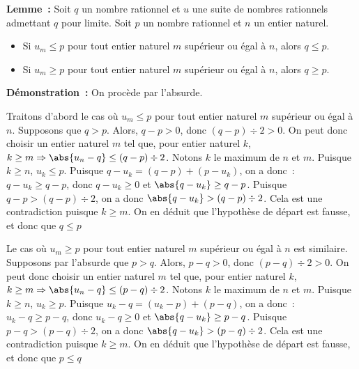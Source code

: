 \medskip

\noindent\textbf{Lemme :} Soit $q$ un nombre rationnel et $u$ une suite de nombres rationnels admettant $q$ pour limite.
    Soit $p$ un nombre rationnel et $n$ un entier naturel.
    \begin{itemize}[nosep]
        \item Si $u_m \leq p$ pour tout entier naturel $m$ supérieur ou égal à $n$, alors $q \leq p$.
        \item Si $u_m \geq p$ pour tout entier naturel $m$ supérieur ou égal à $n$, alors $q \geq p$.
    \end{itemize}

\medskip

\noindent\textbf{Démonstration :} On procède par l'absurde.
    
    Traitons d'abord le cas où $u_m \leq p$ pour tout entier naturel $m$ supérieur ou égal à $n$.
    Supposons que $q > p$. 
    Alors, $q - p > 0$, donc $(q - p) \div 2 > 0$. 
    On peut donc choisir un entier naturel $m$ tel que, pour entier naturel $k$, $k \geq m \Rightarrow \abs{u_n - q} \leq (q - p) \div 2$.
    Notons $k$ le maximum de $n$ et $m$. 
    Puisque $k \geq n$, $u_k \leq p$. 
    Puisque $q - u_k = (q - p) + (p - u_k)$, on a donc : $q - u_k \geq q - p$, donc $q - u_k \geq 0$ et $\abs{q - u_k} \geq q - p$.
    Puisque $q - p > (q - p) \div 2$, on a donc $\abs{q - u_k} > (q - p) \div 2$.
    Cela est une contradiction puisque $k \geq m$.
    On en déduit que l'hypothèse de départ est fausse, et donc que $q \leq p$

    Le cas où $u_m \geq p$ pour tout entier naturel $m$ supérieur ou égal à $n$ est similaire. 
    Supposons par l'absurde que $p > q$. 
    Alors, $p - q > 0$, donc $(p - q) \div 2 > 0$. 
    On peut donc choisir un entier naturel $m$ tel que, pour entier naturel $k$, $k \geq m \Rightarrow \abs{u_n - q} \leq (p - q) \div 2$.
    Notons $k$ le maximum de $n$ et $m$. 
    Puisque $k \geq n$, $u_k \geq p$. 
    Puisque $u_k - q = (u_k - p) + (p - q)$, on a donc : $u_k - q \geq p - q$, donc $u_k - q \geq 0$ et $\abs{q - u_k} \geq p - q$.
    Puisque $p - q > (p - q) \div 2$, on a donc $\abs{q - u_k} > (p - q) \div 2$.
    Cela est une contradiction puisque $k \geq m$.
    On en déduit que l'hypothèse de départ est fausse, et donc que $p \leq q$

    \done

\medskip

